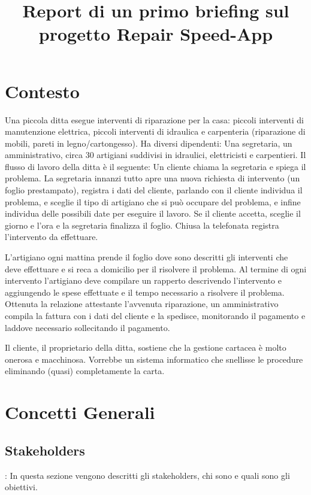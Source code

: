 \documentclass[11pt]{article}
\begin{document}
\author{}
\title{Report di un primo briefing sul progetto Repair Speed-App}
\maketitle

\section{Contesto}
Una piccola ditta esegue interventi di riparazione per la casa:
piccoli interventi di manutenzione elettrica, piccoli interventi di
idraulica e carpenteria (riparazione di mobili, pareti in
legno/cartongesso). Ha diversi dipendenti: Una segretaria, un
amministrativo, circa 30 artigiani suddivisi in idraulici,
elettricisti e carpentieri.
Il flusso di lavoro della ditta \`e il seguente: Un cliente chiama la
segretaria e spiega il problema. La segretaria innanzi tutto apre
una nuova richiesta di intervento (un foglio prestampato), registra
i dati del cliente, parlando con il cliente individua il problema, e
sceglie il tipo di artigiano che si pu\`o occupare del problema, e
infine individua delle possibili date per eseguire il lavoro.  Se il
cliente accetta, sceglie il giorno e l'ora e la segretaria finalizza
il foglio. Chiusa la telefonata registra l'intervento da effettuare.

L'artigiano ogni mattina prende il foglio dove sono descritti gli
interventi che deve effettuare e si reca a domicilio per il risolvere
il problema.
Al termine di ogni intervento l'artigiano deve compilare un rapperto
descrivendo l'intervento e aggiungendo le spese effettuate e il tempo
necessario  a risolvere il problema.
Ottenuta la relazione attestante l'avvenuta riparazione, un
amministrativo compila la fattura con i dati del cliente e la
spedisce, monitorando il pagamento e laddove necessario sollecitando
il pagamento.

 Il cliente, il proprietario della ditta, sostiene che la gestione
 cartacea \`e molto onerosa e macchinosa. Vorrebbe un sistema
 informatico che snellisse le procedure eliminando (quasi)
 completamente la carta.

\section{Concetti Generali}

\subsection{Stakeholders}:
In questa sezione vengono descritti gli stakeholders, chi sono e quali
sono gli obiettivi.
\end{document}
